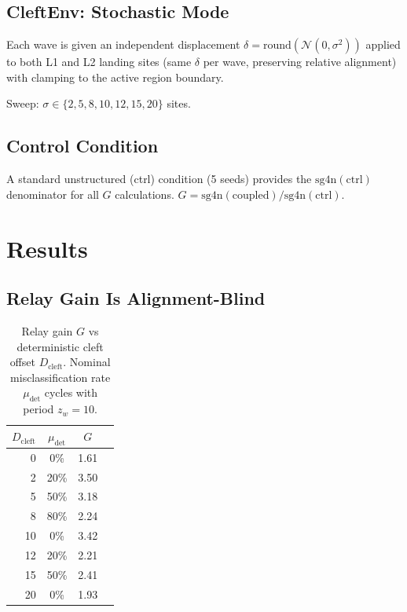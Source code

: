 \documentclass[11pt]{article}
\begin{document}
\subsection{CleftEnv: Stochastic Mode}

Each wave is given an independent displacement
$\delta = \mathrm{round}(\mathcal{N}(0, \sigma^2))$ applied to both
L1 and L2 landing sites (same $\delta$ per wave, preserving relative
alignment) with clamping to the active region boundary.

Sweep: $\sigma \in \{2, 5, 8, 10, 12, 15, 20\}$ sites.

\subsection{Control Condition}

A standard unstructured (ctrl) condition (5 seeds) provides the
$\mathrm{sg4n}(\mathrm{ctrl})$ denominator for all $G$ calculations.
$G = \mathrm{sg4n}(\mathrm{coupled}) / \mathrm{sg4n}(\mathrm{ctrl})$.

\section{Results}

\subsection{Relay Gain Is Alignment-Blind}

\begin{table}[h]
  \centering
  \caption{Relay gain $G$ vs deterministic cleft offset $D_\mathrm{cleft}$.
           Nominal misclassification rate $\mu_\mathrm{det}$ cycles with
           period $z_w = 10$.}
  \label{tab:det}
  \small
  \begin{tabular}{rccc}
    \toprule
    $D_\mathrm{cleft}$ & $\mu_\mathrm{det}$ & $G$ \\
    \midrule
     0  &   0\% & 1.61 \\
     2  &  20\% & 3.50 \\
     5  &  50\% & 3.18 \\
     8  &  80\% & 2.24 \\
    10  &   0\% & 3.42 \\
    12  &  20\% & 2.21 \\
    15  &  50\% & 2.41 \\
    20  &   0\% & 1.93 \\
    \bottomrule
  \end{tabular}
\end{table}
\end{document}

